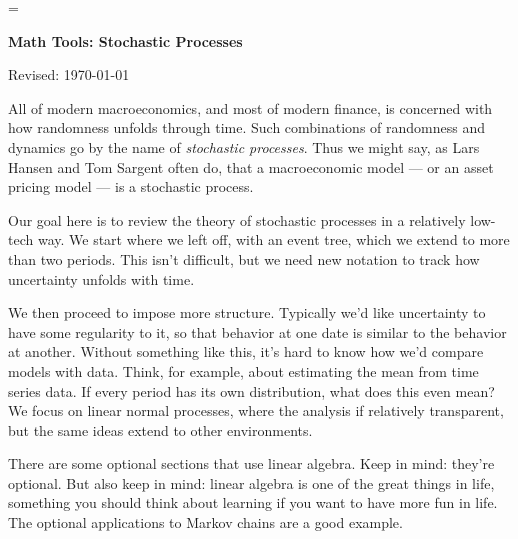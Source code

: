 \documentclass[11pt]{article}
\begin{document}
\parskip=\bigskipamount
\parindent=0.0in
\thispagestyle{empty}


\bigskip\bigskip
\centerline{\Large \bf Math Tools:  Stochastic Processes}
\centerline{Revised: \today}


\begin{comment}
{\bf
*** Meyn and Tweedie re stability \\
*** Recursive approach \\
*** Limiting behavior of mean and (esp) variance \\
*** Law of iterated expectations
}

?? *** think of this as diff rvs **** \\
stationary = time-homogeneous

Hansen and Sargent:  an economic model is a stochastic process...

\end{comment}


\bigskip
All of modern macroeconomics, and most of modern finance,
is concerned with how randomness unfolds through time.
Such combinations of randomness and dynamics go by the name
of {\it stochastic processes\/}.  
Thus we might say, as Lars Hansen and Tom Sargent often do,
that a macroeconomic model --- or an asset pricing model ---
is a stochastic process.  

Our goal here is to review the theory of stochastic processes 
in a relatively low-tech way.  
We start where we left off, with an event tree,
which we extend to more than two periods.
This isn't difficult, but we need new notation to track how
uncertainty unfolds with time.

We then proceed to impose more structure.
Typically we'd like uncertainty to have some regularity to it,
so that behavior at one date is similar to the behavior at another.
Without something like this, it's hard to know how we'd compare models with data.
Think, for example, about estimating the mean from time series data.
If every period has its own distribution, what does this even mean?  
We focus on linear normal processes, where the analysis if relatively transparent,
but the same ideas extend to other environments. 

There are some optional sections that use linear algebra.
Keep in mind:  they're optional. 
But also keep in mind:  linear algebra is one of the great things in life, 
something you should think about learning if you want to have more fun in life.
The optional applications to Markov chains are a good example.  
\end{document}

